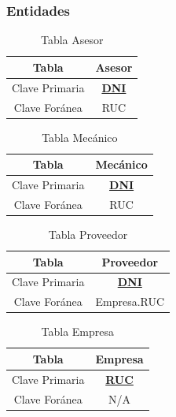 \documentclass[12pt]{article}
\begin{document}
\subsubsection{Entidades}

\begin{table}[htbp]
\begin{center}
\begin{tabular}{|c|c|}
\hline
Tabla & Asesor \\
\hline
Clave Primaria & \textbf{\underline{DNI}} \\
\hline
Clave Foránea & RUC \\
\hline
\end{tabular}        
\caption{Tabla Asesor}
\label{tab:tablas}
\end{center}
\end{table}


\begin{table}[htbp]
\begin{center}
\begin{tabular}{|c|c|}
\hline
Tabla & Mecánico \\
\hline
Clave Primaria & \textbf{\underline{DNI}} \\
\hline
Clave Foránea & RUC \\
\hline
\end{tabular}
\caption{Tabla Mecánico}
\label{tab:tablas}
\end{center}
\end{table}


\begin{table}[htbp]
\begin{center}
\begin{tabular}{|c|c|}
\hline
Tabla & Proveedor \\
\hline
Clave Primaria & \textbf{\underline{DNI}} \\
\hline
Clave Foránea & Empresa.RUC \\
\hline
\end{tabular}
\caption{Tabla Proveedor}
\label{tab:tablas}
\end{center}
\end{table}


\begin{table}[htbp]
\begin{center}
\begin{tabular}{|c|c|}
\hline
Tabla & Empresa \\
\hline
Clave Primaria & \textbf{\underline{RUC}} \\
\hline
Clave Foránea & N/A \\
\hline
\end{tabular}
\caption{Tabla Empresa}
\label{tab:tablas}
\end{center}
\end{table}
\end{document}
